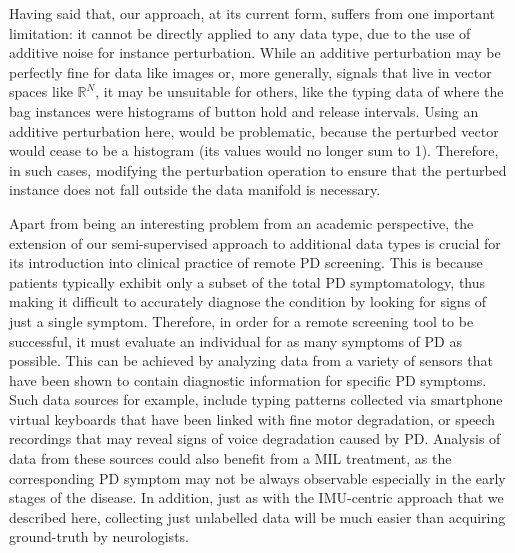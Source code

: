 \documentclass[journal,twoside,web]{ieeecolor}
\begin{document}
Having said that, our approach, at its current form, suffers from one important
limitation: it cannot be directly applied to any data type, due to the use of
additive noise for instance perturbation.  While an additive perturbation may be
perfectly fine for data like images or, more generally, signals that live in
vector spaces like $\mathbb{R}^N$, it may be unsuitable for others, like the
typing data of \cite{alpapado2020pd} where the bag instances
were histograms of button hold and release intervals. Using an 
additive perturbation here, would be problematic, because the perturbed vector would
cease to be a histogram (its values would no longer sum to 1).
Therefore, in such cases, modifying the perturbation operation
to ensure that the perturbed instance  does not fall
outside the data manifold is necessary.

Apart from being an interesting problem from an academic perspective, the
extension of our semi-supervised approach to additional data types is
crucial for its introduction into clinical practice of remote PD screening.
This is because patients typically exhibit only a subset of the total PD
symptomatology, thus making it difficult to accurately diagnose
the condition by looking for signs of just a single symptom.  Therefore, in
order for a remote screening tool to be successful, it must evaluate an individual for as many symptoms
of PD as possible. This can be achieved by analyzing data from a variety of
sensors that have been shown to contain diagnostic information for specific PD
symptoms. Such data sources for example, include typing patterns collected
via smartphone virtual keyboards that have been linked with fine
motor degradation, or speech recordings that may reveal signs of 
voice degradation caused by PD. Analysis of data from these sources  
could also benefit from a MIL treatment, as the corresponding PD symptom may not be
always observable especially in the early stages of the disease. In addition,
just as with the IMU-centric approach that we described here, collecting just unlabelled
data will be much easier than acquiring ground-truth by neurologists.

\end{document}
